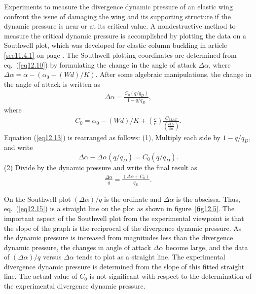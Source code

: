 \documentclass{AeroStructure-ERJohnson}
\begin{document}
Experiments to measure the divergence dynamic pressure of an elastic wing confront the issue of damaging the wing and its supporting structure if the dynamic pressure is near or at its critical value. A nondestructive method to measure the critical dynamic pressure is accomplished by plotting the data on a Southwell plot, which was developed for elastic column buckling in article \ref{sec11.4.1} on page \pageref{sec11.4.1}. The Southwell plotting coordinates are determined from eq.~(\ref{eq12.10}) by formulating the change in the angle of attack $\Delta \alpha$, where $\Delta \alpha=\alpha-\left(\alpha_{0}-(W d) / K\right)$. After some algebraic manipulations, the change in the angle of attack is written as
\begin{align}\label{eq12.13}
\Delta \alpha=\frac{C_{0}\left(q / q_{D}\right)}{1-q / q_{D}},
\end{align}
where
\begin{align}\label{eq12.14}
C_{0}=\alpha_{0}-(W d) / K+\left(\frac{c}{e}\right) \frac{C_{M A C}}{\left(\frac{\partial C_{L}}{\partial \alpha}\right)}.
\end{align}
Equation (\ref{eq12.13}) is rearranged as follows: (1), Multiply each side by $1-q / q_{D}$, and write
\[
\Delta \alpha-\Delta \alpha\left(q / q_{D}\right)=C_{0}\left(q / q_{D}\right).
\]
(2) Divide by the dynamic pressure and write the final result as
\begin{align}\label{eq12.15}
\frac{\Delta \alpha}{q}=\frac{\left(\Delta \alpha+C_{0}\right)}{q_{D}}.
\end{align}

On the Southwell plot $(\Delta \alpha) / q$ is the ordinate and $\Delta \alpha$ is the abscissa. Thus, eq.~(\ref{eq12.15}) is a straight line on the plot as shown in figure~\ref{fig12.5}. The important aspect of the Southwell plot from the experimental viewpoint is that the slope of the graph is the reciprocal of the divergence dynamic pressure. As the dynamic pressure is increased from magnitudes less than the divergence dynamic pressure, the changes in angle of attack $\Delta \alpha$ become large, and the data of $(\Delta \alpha) / q$ versus $\Delta \alpha$ tends to plot as a straight line. The experimental divergence dynamic pressure is determined from the slope of this fitted straight line. The actual value of $C_{0}$ is not significant with respect to the determination of the experimental divergence dynamic pressure.

{\vspace*{-1\baselineskip}
\def\thefigure{12.5}
}
\end{document}
